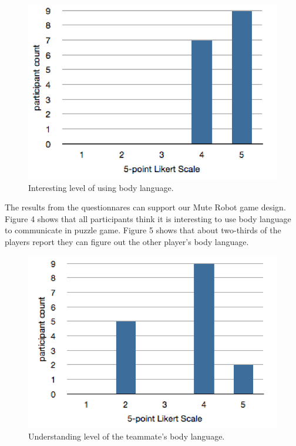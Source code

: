 \documentclass{chi-ext}
\begin{document}
\begin{figure}
  \centering
  \includegraphics[width=0.8\linewidth]{figures/1_BLisInteresting.png}
  \caption{Interesting level of using body language.}
  \label{fig:1_BLisInteresting}
\end{figure}

The results from the questionnares can support our Mute Robot game design. 
Figure 4 shows that all participants think it is interesting to use body language to communicate in puzzle game.
Figure 5 shows that about two-thirds of the players report they can figure out the other player's body language.


\begin{figure}
  \centering
  \includegraphics[width=0.9\linewidth]{figures/2_BLunderstand.png}
  \caption{Understanding level of the teammate's body language.}
  \label{fig:2_BLunderstand}
\end{figure}

\end{document}
